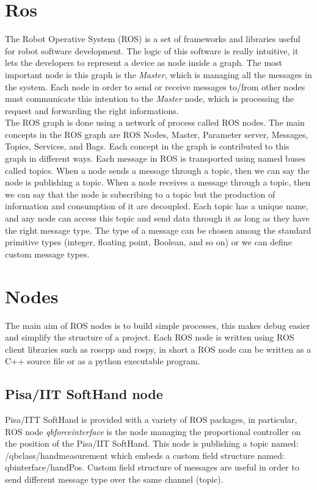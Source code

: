 \section{Ros}
The Robot Operative System (ROS) is a set of frameworks and libraries useful for robot software development. The logic of this software is really intuitive, it lets the developers to represent a device as node inside a graph. The most important node is this graph is the \textit{Master}, which is managing all the messages in the system. Each node in order to send or receive messages to/from other nodes must communicate this intention to the \textit{Master} node, which is processing the request and forwarding the right informations.\\
The ROS graph is done using a network of process called ROS nodes.
The main concepts in the ROS graph are ROS Nodes, Master, Parameter server, Messages,
Topics, Services, and Bags. Each concept in the graph is contributed to this graph
in different ways.
Each message in ROS is transported using named buses called topics. When a node sends a message through a topic, then we can say the node is publishing a topic. When a node receives a message through a topic,
then we can say that the node is subscribing to a topic but the production of information and consumption of it are decoupled. Each topic has a unique name, and any node can access this topic and send data through it as long as they have the right message type. The type of a message can be chosen among the standard primitive types (integer, floating point, Boolean, and so on) or we can define custom message types.

\section{Nodes}
The main aim of ROS nodes is to build simple processes, this makes debug easier and simplify the structure of a project. Each ROS node is written using ROS client libraries such as roscpp and rospy, in short a ROS node can be written as a C++ source file or as a python executable program. \\
\subsection{Pisa/IIT SoftHand node}
Pisa/ITT SoftHand is provided with a variety of ROS packages, in particular, ROS node \textit{qb\textunderscore force\textunderscore interface} is the node managing the proportional controller on the position of the Pisa/IIT SoftHand. This node is publishing a topic named: /qb\textunderscore class/hand\textunderscore measurement which embeds a custom field structure named: qb\textunderscore interface/handPos. Custom field structure of messages are useful in order to send different message type over the same channel (topic).\\


